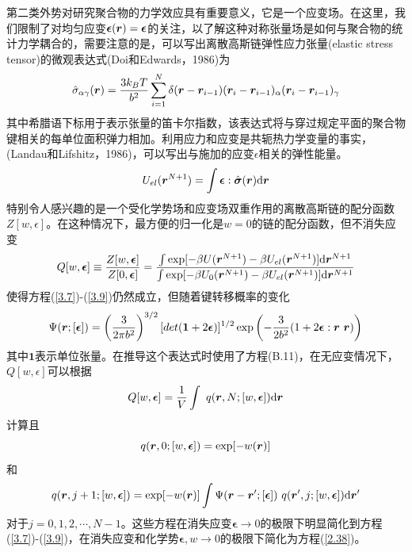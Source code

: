 第二类外势对研究聚合物的力学效应具有重要意义，它是一个应变场。在这里，我们限制了对均匀应变$\boldsymbol{\epsilon}(\bm{r})=\boldsymbol{\epsilon}$的关注，以了解这种对称张量场是如何与聚合物的统计力学耦合的，需要注意的是，可以写出离散高斯链弹性应力张量(elastic stress tensor)的微观表达式(Doi和Edwards，1986)为
\begin{equation}\label{3.11}
\hat{\sigma}_{\alpha\gamma}(\bm{r})=\frac{3k_BT}{b^2}\sum\limits_{i=1}^N\delta(\bm{r}-\bm{r}_{i-1})(\bm{r}_{i}-\bm{r}_{i-1})_{\alpha}(\bm{r}_i-\bm{r}_{i-1})_{\gamma}
\end{equation}
其中希腊语下标用于表示张量的笛卡尔指数，该表达式将与穿过规定平面的聚合物键相关的每单位面积弹力相加。利用应力和应变是共轭热力学变量的事实，(Landau和Lifshitz，1986)，可以写出与施加的应变$\epsilon$相关的弹性能量。
\begin{equation}\label{3.12}
U_{el}(\bm{r}^{N+1})=\int\boldsymbol{\epsilon}:\hat{\boldsymbol{\sigma}}(\bm{r})\mathrm{d}\bm{r}
\end{equation}
特别令人感兴趣的是一个受化学势场和应变场双重作用的离散高斯链的配分函数$Z[w,\epsilon]$。在这种情况下，最方便的归一化是$w=0$的链的配分函数，但不消失应变
\begin{equation}\label{3.13}
Q[w,\boldsymbol{\epsilon}]\equiv\frac{Z[w,\boldsymbol{\epsilon}]}{Z[0,\boldsymbol{\epsilon}]}=\frac{\int\exp[-\beta U(\bm{r}^{N+1})-\beta U_{el}(\bm{r}^{N+1})]\mathrm{d}\bm{r}^{N+1}}{\int\exp[-\beta U_0(\bm{r}^{N+1})-\beta U_{el}(\bm{r}^{N+1})]\mathrm{d}\bm{r}^{N+1}}
\end{equation}
使得方程(\ref{3.7})-(\ref{3.9})仍然成立，但随着键转移概率的变化
\begin{equation}\label{3.14}
\Psi(\bm{r};[\boldsymbol{\epsilon}])=\left(\frac{3}{2\pi b^2}\right)^{3/2}[det(\boldsymbol{1}+2\boldsymbol{\epsilon})]^{1/2}\exp\left(-\frac{3}{2b^2}(1+2\boldsymbol{\epsilon}:\bm{r}~\bm{r})\right)
\end{equation}
其中$\boldsymbol{1}$表示单位张量。在推导这个表达式时使用了方程(B.11)，在无应变情况下，$Q[w,\epsilon]$可以根据
\begin{equation}\label{3.15}
Q[w,\boldsymbol{\epsilon}]=\frac{1}{V}\int~q(\bm{r},N;[w,\boldsymbol{\epsilon}])\mathrm{d}\bm{r}
\end{equation}
计算且
\begin{equation}\label{3.16}
q(\bm{r},0;[w,\boldsymbol{\epsilon}])=\exp[-w(\bm{r})]
\end{equation}
和
\begin{equation}\label{3.17}
q(\bm{r},j+1;[w,\boldsymbol{\epsilon}])=\exp[-w(\bm{r})]\int\Psi(\bm{r}-\bm{r}';[\boldsymbol{\epsilon}])~q(\bm{r}',j;[w,\boldsymbol{\epsilon}])\mathrm{d}\bm{r}'
\end{equation}
对于$j=0,1,2,\cdots,N-1$。这些方程在消失应变$\boldsymbol{\epsilon}\rightarrow 0$的极限下明显简化到方程(\ref{3.7})-(\ref{3.9})，在消失应变和化学势$\boldsymbol{\epsilon},w\rightarrow 0$的极限下简化为方程(\ref{2.38})。

